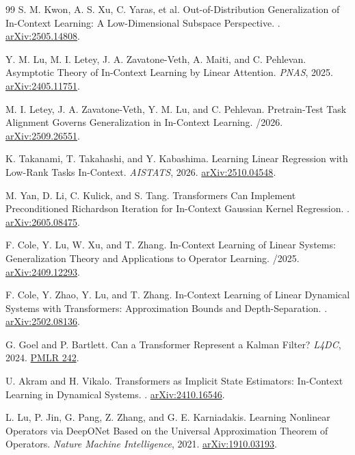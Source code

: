 \documentclass[11pt,a4paper]{article}
\begin{document}
\begin{thebibliography}{99}
S. M. Kwon, A. S. Xu, C. Yaras, et al.
\newblock Out-of-Distribution Generalization of In-Context Learning: A Low-Dimensional Subspace Perspective.
. \href{https://arxiv.org/abs/2505.14808}{arXiv:2505.14808}.

Y. M. Lu, M. I. Letey, J. A. Zavatone-Veth, A. Maiti, and C. Pehlevan.
\newblock Asymptotic Theory of In-Context Learning by Linear Attention.
\newblock \emph{PNAS}, 2025. \href{https://arxiv.org/abs/2405.11751}{arXiv:2405.11751}.

M. I. Letey, J. A. Zavatone-Veth, Y. M. Lu, and C. Pehlevan.
\newblock Pretrain-Test Task Alignment Governs Generalization in In-Context Learning.
/2026. \href{https://arxiv.org/abs/2509.26551}{arXiv:2509.26551}.

K. Takanami, T. Takahashi, and Y. Kabashima.
\newblock Learning Linear Regression with Low-Rank Tasks In-Context.
\newblock \emph{AISTATS}, 2026. \href{https://arxiv.org/abs/2510.04548}{arXiv:2510.04548}.

M. Yan, D. Li, C. Kulick, and S. Tang.
\newblock Transformers Can Implement Preconditioned Richardson Iteration for In-Context Gaussian Kernel Regression.
. \href{https://arxiv.org/abs/2605.08475}{arXiv:2605.08475}.

F. Cole, Y. Lu, W. Xu, and T. Zhang.
\newblock In-Context Learning of Linear Systems: Generalization Theory and Applications to Operator Learning.
/2025. \href{https://arxiv.org/abs/2409.12293}{arXiv:2409.12293}.

F. Cole, Y. Zhao, Y. Lu, and T. Zhang.
\newblock In-Context Learning of Linear Dynamical Systems with Transformers: Approximation Bounds and Depth-Separation.
. \href{https://arxiv.org/abs/2502.08136}{arXiv:2502.08136}.

G. Goel and P. Bartlett.
\newblock Can a Transformer Represent a Kalman Filter?
\newblock \emph{L4DC}, 2024. \href{https://proceedings.mlr.press/v242/goel24a.html}{PMLR 242}.

U. Akram and H. Vikalo.
\newblock Transformers as Implicit State Estimators: In-Context Learning in Dynamical Systems.
. \href{https://arxiv.org/abs/2410.16546}{arXiv:2410.16546}.

L. Lu, P. Jin, G. Pang, Z. Zhang, and G. E. Karniadakis.
\newblock Learning Nonlinear Operators via DeepONet Based on the Universal Approximation Theorem of Operators.
\newblock \emph{Nature Machine Intelligence}, 2021. \href{https://arxiv.org/abs/1910.03193}{arXiv:1910.03193}.


\end{thebibliography}
\end{document}
